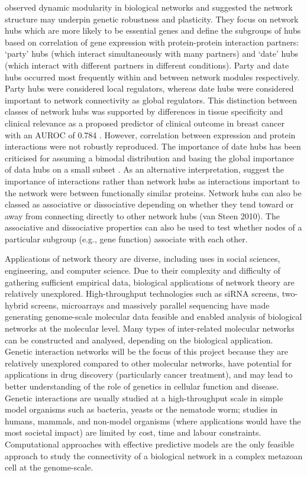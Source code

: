\citet{Han2004} observed dynamic modularity in biological networks and suggested the network structure may underpin genetic robustness and plasticity. They focus on network hubs which are more likely to be essential genes and define the subgroups of hubs based on correlation of gene expression with protein-protein interaction partners: `party' hubs (which interact simultaneously with many partners) and `date' hubs (which interact with different partners in different conditions). Party and date hubs occurred most frequently within and between network modules respectively. Party hubs were considered local regulators, whereas date hubs were considered important to network connectivity as global regulators. This distinction between classes of network hubs was supported by differences in tissue specificity and clinical relevance as a proposed predictor of clinical outcome in breast cancer with an \gls{AUROC} of 0.784 \citet{Taylor2009}. However, correlation between expression and protein interactions were not robustly reproduced. The importance of date hubs has been criticised for assuming a bimodal distribution and basing the global importance of data hubs on a small subset \citet{Agarwal2010}. As an alternative interpretation, \citep{Agarwal2010} suggest the importance of interactions rather than network hubs as interactions important to the network were between functionally similar proteins. Network hubs can also be classed as associative or dissociative depending on whether they tend toward or away from connecting directly to other network hubs (van Steen 2010). The associative and dissociative properties can also be used to test whether nodes of a particular subgroup (e.g., gene function) associate with each other. 

Applications of network theory are diverse, including uses in social sciences, engineering, and computer science. Due to their complexity and difficulty of gathering sufficient empirical data, biological applications of network theory are relatively unexplored. High-throughput technologies such as siRNA screens, two-hybrid screens, microarrays and massively parallel sequencing have made generating genome-scale molecular data feasible and enabled analysis of biological networks at the molecular level. Many types of inter-related molecular networks can be constructed and analysed, depending on the biological application. Genetic interaction networks will be the focus of this project because they are relatively unexplored compared to other molecular networks, have potential for applications in drug discovery (particularly cancer treatment), and may lead to better understanding of the role of genetics in cellular function and disease. Genetic interactions are usually studied at a high-throughput scale in simple model organisms such as bacteria, yeasts or the nematode worm; studies in humans, mammals, and non-model organisms (where applications would have the most societal impact) are limited by cost, time and labour constraints. Computational approaches with effective predictive models are the only feasible approach to study the connectivity of a biological network in a complex metazoan cell at the genome-scale.


